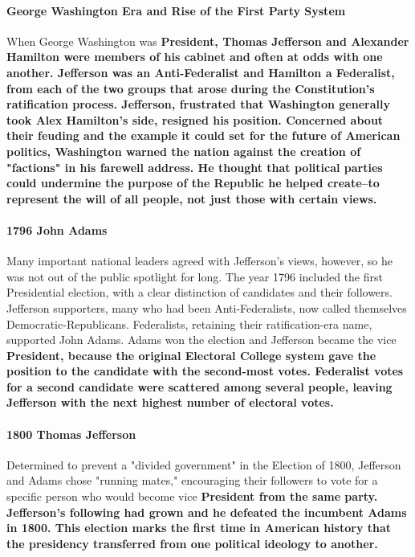 \paragraph{George Washington Era and Rise of the First Party System} When George
Washington was \bf{President}, Thomas Jefferson and Alexander Hamilton were
members of his cabinet and often at odds with one another. Jefferson was an
Anti-Federalist and Hamilton a Federalist, from each of the two groups that
arose during the Constitution's ratification process. Jefferson, frustrated that
Washington generally took Alex Hamilton's side, resigned his position. Concerned
about their feuding and the example it could set for the future of American
politics, Washington warned the nation against the creation of "factions" in his
farewell address. He thought that political parties could undermine the purpose
of the Republic he helped create–to represent the will of all people, not just
those with certain views.

\paragraph{1796 John Adams} Many important national leaders agreed with
Jefferson's views, however, so he was not out of the public spotlight for long.
The year 1796 included the first Presidential election, with a clear distinction
of candidates and their followers. Jefferson supporters, many who had been
Anti-Federalists, now called themselves Democratic-Republicans. Federalists,
retaining their ratification-era name, supported John Adams. Adams won the
election and Jefferson became the vice \bf{President}, because the original
Electoral College system gave the position to the candidate with the second-most
votes. Federalist votes for a second candidate were scattered among several
people, leaving Jefferson with the next highest number of electoral votes.

\paragraph{1800 Thomas Jefferson} Determined to prevent a "divided government"
in the Election of 1800, Jefferson and Adams chose "running mates," encouraging
their followers to vote for a specific person who would become vice
\bf{President} from the same party. Jefferson's following had grown and he
defeated the incumbent Adams in 1800. This election marks the first time in
American history that the presidency transferred from one political ideology to
another.

